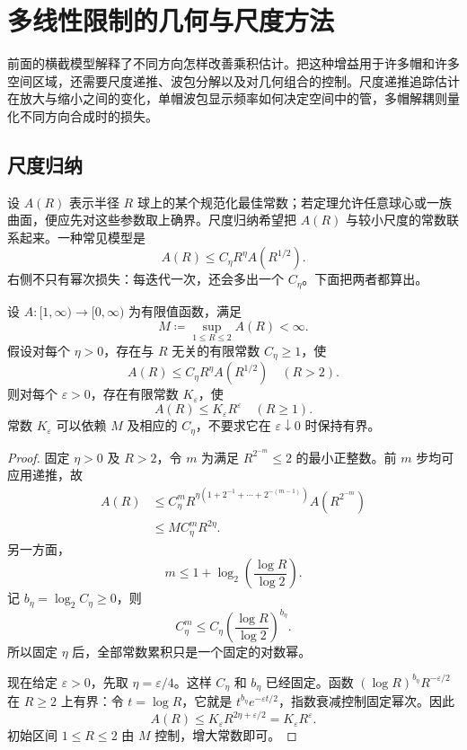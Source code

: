 \section{多线性限制的几何与尺度方法}
\label{b2:sec:2505}

前面的横截模型解释了不同方向怎样改善乘积估计。把这种增益用于许多帽和许多空间区域，还需要尺度递推、波包分解以及对几何组合的控制。尺度递推追踪估计在放大与缩小之间的变化，单帽波包显示频率如何决定空间中的管，多帽解耦则量化不同方向合成时的损失。

\subsection{尺度归纳}
\label{b2:subsec:250501}

设 \(A(R)\) 表示半径 \(R\) 球上的某个规范化最佳常数；若定理允许任意球心或一族曲面，便应先对这些参数取上确界。尺度归纳希望把 \(A(R)\) 与较小尺度的常数联系起来。一种常见模型是
\[
 A(R)\leq C_\eta R^\eta A(R^{1/2}).
\]
右侧不只有幂次损失：每迭代一次，还会多出一个 \(C_\eta\)。下面把两者都算出。

\begin{lemma}[平方根尺度递推]\label{b2:lem:25-scale-iteration}
设 \(A:[1,\infty)\to[0,\infty)\) 为有限值函数，满足
\[
 M\coloneqq\sup_{1\leq R\leq2}A(R)<\infty.
\]
假设对每个 \(\eta>0\)，存在与 \(R\) 无关的有限常数 \(C_\eta\geq1\)，使
\[
 A(R)\leq C_\eta R^\eta A(R^{1/2})\quad(R>2).
\]
则对每个 \(\varepsilon>0\)，存在有限常数 \(K_\varepsilon\)，使
\[
 A(R)\leq K_\varepsilon R^\varepsilon\quad(R\geq1).
\]
常数 \(K_\varepsilon\) 可以依赖 \(M\) 及相应的 \(C_\eta\)，不要求它在 \(\varepsilon\downarrow0\) 时保持有界。
\end{lemma}
\begin{proof}
固定 \(\eta>0\) 及 \(R>2\)，令 \(m\) 为满足 \(R^{2^{-m}}\leq2\) 的最小正整数。前 \(m\) 步均可应用递推，故
\[
 \begin{aligned}
 A(R)
 &\leq C_\eta^m
       R^{\eta(1+2^{-1}+\cdots+2^{-(m-1)})}
       A(R^{2^{-m}})\\
 &\leq M C_\eta^m R^{2\eta}.
 \end{aligned}
\]
另一方面，
\[
 m\leq1+\log_2\!\left(\frac{\log R}{\log2}\right).
\]
记 \(b_\eta=\log_2 C_\eta\geq0\)，则
\[
 C_\eta^m
 \leq C_\eta\left(\frac{\log R}{\log2}\right)^{b_\eta}.
\]
所以固定 \(\eta\) 后，全部常数累积只是一个固定的对数幂。

现在给定 \(\varepsilon>0\)，先取 \(\eta=\varepsilon/4\)。这样 \(C_\eta\) 和 \(b_\eta\) 已经固定。函数
\((\log R)^{b_\eta}R^{-\varepsilon/2}\)
在 \(R\geq2\) 上有界：令 \(t=\log R\)，它就是 \(t^{b_\eta}e^{-\varepsilon t/2}\)，指数衰减控制固定幂次。因此
\[
 A(R)\leq K_\varepsilon
          R^{2\eta+\varepsilon/2}
       =K_\varepsilon R^\varepsilon.
\]
初始区间 \(1\leq R\leq2\) 由 \(M\) 控制，增大常数即可。
\end{proof}

